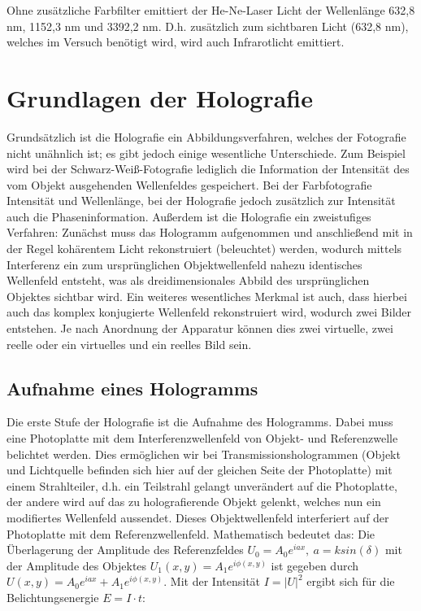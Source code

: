\documentclass[bigchapter,colorback,accentcolor=tud4b,linedtoc,11pt]{tudreport}
\begin{document}
Ohne zusätzliche Farbfilter emittiert der He-Ne-Laser Licht der Wellenlänge 632,8 nm, 1152,3 nm und 3392,2 nm. D.h. zusätzlich zum sichtbaren Licht (632,8 nm), welches im Versuch benötigt wird, wird auch Infrarotlicht emittiert. 

\section{Grundlagen der Holografie}

Grundsätzlich ist die Holografie ein Abbildungsverfahren, welches der Fotografie nicht unähnlich ist; es gibt jedoch einige wesentliche Unterschiede. Zum Beispiel wird bei der Schwarz-Weiß-Fotografie lediglich die Information der Intensität des vom Objekt ausgehenden Wellenfeldes gespeichert. Bei der Farbfotografie Intensität und Wellenlänge, bei der Holografie jedoch zusätzlich zur Intensität auch die Phaseninformation. Außerdem ist die Holografie ein zweistufiges Verfahren: Zunächst muss das Hologramm aufgenommen und anschließend mit in der Regel kohärentem Licht rekonstruiert (beleuchtet) werden, wodurch mittels Interferenz ein zum ursprünglichen Objektwellenfeld nahezu identisches Wellenfeld entsteht, was als dreidimensionales Abbild des ursprünglichen Objektes sichtbar wird. Ein weiteres wesentliches Merkmal ist auch, dass hierbei auch das komplex konjugierte Wellenfeld rekonstruiert wird, wodurch zwei Bilder entstehen. Je nach Anordnung der Apparatur können dies zwei virtuelle, zwei reelle oder ein virtuelles und ein reelles Bild sein.

\subsection{Aufnahme eines Hologramms}

Die erste Stufe der Holografie ist die Aufnahme des Hologramms. Dabei muss eine Photoplatte mit dem Interferenzwellenfeld von Objekt- und Referenzwelle belichtet werden. Dies ermöglichen wir bei Transmissionshologrammen (Objekt und Lichtquelle befinden sich hier auf der gleichen Seite der Photoplatte) mit einem Strahlteiler, d.h. ein Teilstrahl gelangt unverändert auf die Photoplatte, der andere wird auf das zu holografierende Objekt gelenkt, welches nun ein modifiertes Wellenfeld aussendet. Dieses Objektwellenfeld interferiert auf der Photoplatte mit dem Referenzwellenfeld. Mathematisch bedeutet das: Die Überlagerung der Amplitude des Referenzfeldes $U_0 = A_0 e^{iax} , ~ a = k sin(\delta) $ mit der Amplitude des Objektes $U_1(x,y) = A_1 e^{i \phi (x,y)}$ ist gegeben durch $U(x,y) = A_0 e^{iax} +  A_1 e^{i \phi (x,y)}$. Mit der Intensität $I= |U|^2$ ergibt sich für die Belichtungsenergie $E = I \cdot t$: 
\end{document}
